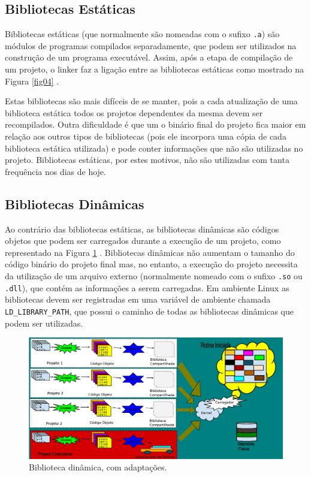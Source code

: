 \subsection{Bibliotecas Estáticas}

Bibliotecas estáticas (que normalmente  são nomeadas com o  sufixo \texttt{.a}) 
são módulos de programas compilados separadamente, que podem ser utilizados
 na construção de um programa executável. Assim, após a etapa de compilação de
 um projeto, o linker faz a ligação entre as bibliotecas estáticas como
 mostrado na Figura \ref{fig04} \cite[pag.54]{ref39}.

Estas bibliotecas são mais difíceis de se manter, pois a cada atualização de uma
 biblioteca estática todos os projetos dependentes da mesma devem ser recompilados.
 Outra dificuldade é que um o binário final do projeto fica maior em relação aos
 outros tipos de bibliotecas (pois ele incorpora uma cópia de cada biblioteca
 estática utilizada) e pode conter informações que não são utilizadas no projeto.
 Bibliotecas estáticas, por estes motivos, não são utilizadas com tanta
 frequência nos dias de hoje.


\subsection{Bibliotecas Dinâmicas}

Ao contrário das bibliotecas estáticas, as bibliotecas dinâmicas são códigos
 objetos que podem ser carregados durante a execução de um projeto, como
 representado na Figura \ref{fig06} \cite[pag.57]{ref39}. Bibliotecas dinâmicas 
não aumentam o tamanho do código binário do projeto final mas, no entanto,
 a execução do projeto necessita da utilização de um arquivo externo
 (normalmente nomeado com o sufixo \texttt{.so} ou \texttt{.dll}), que contém as
 informações a serem carregadas\cite{Lasca2}. Em ambiente Linux as
 bibliotecas devem ser  registradas em uma variável de ambiente chamada
 \texttt{LD\_LIBRARY\_PATH}, que possui o caminho de todas as bibliotecas dinâmicas
 que podem ser utilizadas.

\begin{figure}[h]
    \centering
        \includegraphics[keepaspectratio=true,scale=0.45]{figuras/dynamic_lib.eps}
    \caption{Biblioteca dinâmica,\cite[pag.55]{ref39} com adaptações.}
    \label{fig06}
\end{figure}


